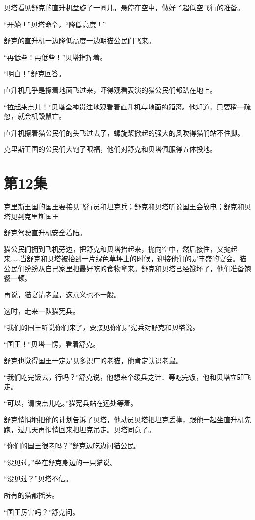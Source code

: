 \documentclass[a4paper,12pt,UTF8,twoside]{ctexbook}
\begin{document}
贝塔看见舒克的直升机盘旋了一圈儿，悬停在空中，做好了超低空飞行的准备。

“开始！”贝塔命令，“降低高度！”

舒克的直升机一边降低高度一边朝猫公民们飞来。

“再低些！再低些！”贝塔指挥着。

“明白！”舒克回答。

直升机几乎是擦着地面飞过来，吓得观看表演的猫公民们都趴在地上。

“拉起来点儿！”贝塔全神贯注地观看着直升机与地面的距离。他知道，只要稍一疏忽，就会机毁鼠亡。

直升机擦着猫公民们的头飞过去了，螺旋桨掀起的强大的风吹得猫们站不住脚。

克里斯王国的公民们大饱了眼福，他们对舒克和贝塔佩服得五体投地。   

\chapter{第12集}

克里斯王国的国王要接见飞行员和坦克兵；舒克和贝塔听说国王会放电；舒克和贝塔见到克里斯国王

舒克驾驶直升机安全着陆。

猫公民们拥到飞机旁边，把舒克和贝塔抬起来，抛向空中，然后接住，又抛起来……当舒克和贝塔被抬到一片绿色草坪上的时候，迎接他们的是丰盛的宴会。猫公民们纷纷从自己家里把最好吃的食物拿来。舒克和贝塔已经饿坏了，他们准备饱餐一顿。

再说，猫宴请老鼠，这意义也不一般。

这时，走来一队猫宪兵。

“我们的国王听说你们来了，要接见你们。”宪兵对舒克和贝塔说。

“国王！”贝塔一愣，看着舒克。

舒克也觉得国王一定是见多识广的老猫，他肯定认识老鼠。

“我们吃完饭去，行吗？”舒克说，他想来个缓兵之计．等吃完饭，他和贝塔立即飞走。

“可以，请快点儿吃。”猫宪兵站在远处等着。

舒克悄悄地把他的计划告诉了贝塔，他动员贝塔把坦克丢掉，跟他一起坐直升机先跑，过几天再悄悄回来把坦克吊走。贝塔同意了。

“你们的国王很老吗？”舒克边吃边问猫公民。

“没见过。”坐在舒克身边的一只猫说。

“没见过？”贝塔不信。

所有的猫都摇头。

“国王厉害吗？”舒克问。
\end{document}
